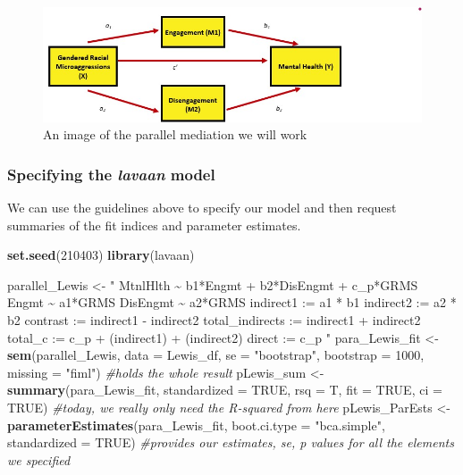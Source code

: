 \documentclass[
  11pt,
]{book}
\newenvironment{Shaded}{\begin{snugshade}}{\end{snugshade}}
\newcommand{\AttributeTok}[1]{\textcolor[rgb]{0.27,0.27,0.27}{#1}}
\newcommand{\CommentTok}[1]{\textcolor[rgb]{0.37,0.37,0.37}{\textit{#1}}}
\newcommand{\ConstantTok}[1]{\textcolor[rgb]{0.37,0.37,0.37}{#1}}
\newcommand{\DecValTok}[1]{\textcolor[rgb]{0.06,0.06,0.06}{#1}}
\newcommand{\FunctionTok}[1]{\textcolor[rgb]{0.27,0.27,0.27}{\textbf{#1}}}
\newcommand{\NormalTok}[1]{#1}
\newcommand{\OtherTok}[1]{\textcolor[rgb]{0.37,0.37,0.37}{#1}}
\newcommand{\StringTok}[1]{\textcolor[rgb]{0.5,0.5,0.5}{#1}}
\begin{document}
\begin{figure}
\centering
\includegraphics{images/CompMed/LewisParaMed.jpg}
\caption{An image of the parallel mediation we will work}
\end{figure}

\hypertarget{specifying-the-lavaan-model}{%
\subsubsection{\texorpdfstring{Specifying the \emph{lavaan} model}{Specifying the lavaan model}}\label{specifying-the-lavaan-model}}

We can use the guidelines above to specify our model and then request summaries of the fit indices and parameter estimates.

\begin{Shaded}
\begin{Highlighting}[]
\FunctionTok{set.seed}\NormalTok{(}\DecValTok{210403}\NormalTok{)}
\FunctionTok{library}\NormalTok{(lavaan)}

\NormalTok{parallel\_Lewis }\OtherTok{\textless{}{-}} \StringTok{"}
\StringTok{    MtnlHlth \textasciitilde{} b1*Engmt + b2*DisEngmt + c\_p*GRMS}
\StringTok{    Engmt \textasciitilde{} a1*GRMS    }
\StringTok{    DisEngmt \textasciitilde{} a2*GRMS}
\StringTok{    indirect1 := a1 * b1}
\StringTok{    indirect2 := a2 * b2}
\StringTok{    contrast := indirect1 {-} indirect2}
\StringTok{    total\_indirects := indirect1 + indirect2}
\StringTok{    total\_c := c\_p + (indirect1) + (indirect2)}
\StringTok{    direct := c\_p}
\StringTok{"}
\NormalTok{para\_Lewis\_fit }\OtherTok{\textless{}{-}} \FunctionTok{sem}\NormalTok{(parallel\_Lewis, }\AttributeTok{data =}\NormalTok{ Lewis\_df, }\AttributeTok{se =} \StringTok{"bootstrap"}\NormalTok{,}
    \AttributeTok{bootstrap =} \DecValTok{1000}\NormalTok{, }\AttributeTok{missing =} \StringTok{"fiml"}\NormalTok{)  }\CommentTok{\#holds the \textquotesingle{}whole\textquotesingle{} result}
\NormalTok{pLewis\_sum }\OtherTok{\textless{}{-}} \FunctionTok{summary}\NormalTok{(para\_Lewis\_fit, }\AttributeTok{standardized =} \ConstantTok{TRUE}\NormalTok{, }\AttributeTok{rsq =}\NormalTok{ T, }\AttributeTok{fit =} \ConstantTok{TRUE}\NormalTok{,}
    \AttributeTok{ci =} \ConstantTok{TRUE}\NormalTok{)  }\CommentTok{\#today, we really only need the R{-}squared from here    }
\NormalTok{pLewis\_ParEsts }\OtherTok{\textless{}{-}} \FunctionTok{parameterEstimates}\NormalTok{(para\_Lewis\_fit, }\AttributeTok{boot.ci.type =} \StringTok{"bca.simple"}\NormalTok{,}
    \AttributeTok{standardized =} \ConstantTok{TRUE}\NormalTok{)  }\CommentTok{\#provides our estimates, se, p values for all the elements we specified}
\end{Highlighting}
\end{Shaded}
\end{document}
